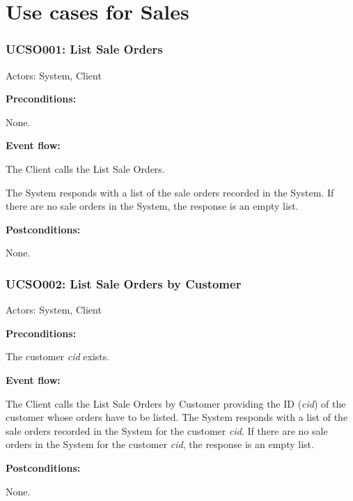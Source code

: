 \section{Use cases for Sales}

\begin{ucbox}{\subsubsection{UCSO001: List Sale Orders}}
\label{UCSO001}

Actors: System, Client

\textbf{Preconditions:}

\ucitem None.

\textbf{Event flow:}

\ucitem The Client calls the List Sale Orders.

\ucitem The System responds with a list of the sale orders recorded in the System. If there are no sale orders in the System, the response is an empty list.

\textbf{Postconditions:}

\ucitem None.

\end{ucbox}

\begin{ucbox}{\subsubsection{UCSO002: List Sale Orders by Customer}}
\label{UCSO002}

Actors: System, Client

\textbf{Preconditions:}

\ucitem The customer \textit{cid} exists.

\textbf{Event flow:}

\ucitem The Client calls the List Sale Orders by Customer providing the ID (\textit{cid}) of the customer whose orders have to be listed.
\ucitem The System responds with a list of the sale orders recorded in the System for the customer \textit{cid}. If there are no sale orders in the System for the customer \textit{cid}, the 
response is an empty list.

\textbf{Postconditions:}

\ucitem None.

\end{ucbox}


